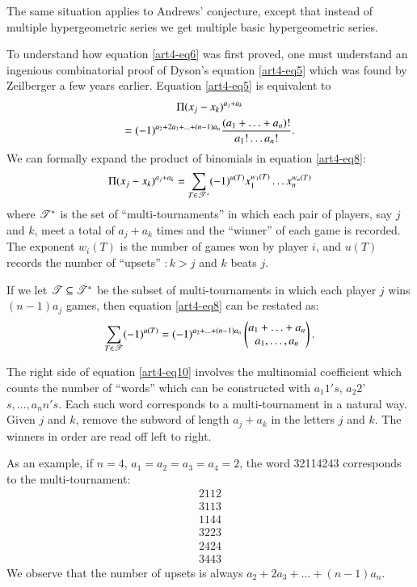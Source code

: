 The same situation applies to Andrews' conjecture, except that instead of multiple hypergeometric series we get multiple basic hypergeometric series. 

To understand how equation \eqref{art4-eq6} was first proved, one must understand an ingenious combinatorial  proof of Dyson's equation \eqref{art4-eq5} which was found by Zeilberger \cite{art4-key24} a few years earlier. Equation \eqref{art4-eq5} is equivalent to 
\begin{gather}
[(x^{a_1}_1 \ldots x^{a_n}_n)^{n-1}] \Pi (x_j - x_k)^{a_j+a_k} \label{art4-eq8} \\
= (-1)^{a_2 + 2a_3 + \ldots  + (n-1) a_n} \frac{(a_1+ \ldots + a_n)!}{a_1 !\ldots a_n!}. \notag
\end{gather}\pageoriginale 
We can formally expand the product of binomials in equation \eqref{art4-eq8}:
\begin{equation}
\Pi (x_j - x_k)^{a_j+ a_k} = \sum\limits_{T \in \mathscr{T}^\ast} (-1)^{u(T)} x_1^{w_1 (T)} \ldots x_n^{w_n(T)} \label{art4-eq9}
\end{equation}
where $\mathscr{T}^\ast$ is the set of ``multi-tournaments'' in which each pair of players, say $j$ and $k$, meet a total of $a_j + a_k $ times and the ``winner'' of each game is recorded. The exponent $w_i (T)$ is the number of games won by player $i$, and $u(T)$ records the number of ``upsets'' $: k > j$ and $k$ beats $j$.

If we let $\mathscr{T} \subseteq \mathscr{T}^\ast$ be the subset of multi-tournaments in which each player $j$ wins $(n-1)a_j$ games,  then equation \eqref{art4-eq8} can be restated as:
\begin{equation}
\sum\limits_{T \in \mathscr{T}} (-1)^{u(T)} = (-1)^{a_2 + \ldots + (n-1) a_n} 
\begin{pmatrix}
a_1 + \ldots + a_n\\
a_1, \ldots, a_n \end{pmatrix}. \label{art4-eq10}
\end{equation}

The right side of equation \eqref{art4-eq10} involves the multinomial coefficient which counts the number of ``words'' which can be constructed with $a_1 1's$, $a_2 2$' $s, \ldots, a_n n's$. Each such word corresponds to a multi-tournament in a natural way. Given $j$ and $k$, remove the subword of length $a_j + a_k$ in the letters $j$ and $k$. The winners in order are read off left to right. 

As an example, if $n = 4$, $a_1 =a_2 = a_3 =a_4 =2$, the word 32114243 corresponds to the multi-tournament:
\begin{align*}
2112\\
3113\\
1144\\
3223\\
2424\\
3443
\end{align*}
We observe that the number of upsets is always $a_2 +2a_3 + \ldots + (n-1)a_n$.

